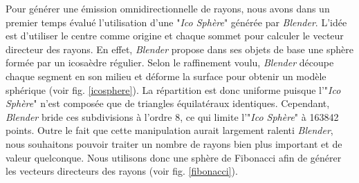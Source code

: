 Pour générer une émission omnidirectionnelle de rayons, nous avons dans un premier temps évalué l'utilisation d'une "\textit{Ico Sphère}" générée par \textit{Blender}. L'idée est d'utiliser le centre comme origine et chaque sommet pour calculer le vecteur directeur des rayons. En effet, \textit{Blender} propose dans ses objets de base une sphère formée par un icosaèdre régulier. Selon le raffinement voulu, \textit{Blender} découpe chaque segment en son milieu et déforme la surface pour obtenir un modèle sphérique (voir fig. \ref{icosphere}). La répartition est donc uniforme puisque l'"\textit{Ico Sphère}" n'est composée que de triangles équilatéraux identiques. Cependant, \textit{Blender} bride ces subdivisions à l'ordre 8, ce qui limite l'"\textit{Ico Sphère}" à 163842 points. Outre le fait que cette manipulation aurait largement ralenti \textit{Blender}, nous souhaitons pouvoir traiter un nombre de rayons bien plus important et de valeur quelconque. Nous utilisons donc une sphère de Fibonacci afin de générer les vecteurs directeurs des rayons (voir fig. \ref{fibonacci}). 
%
